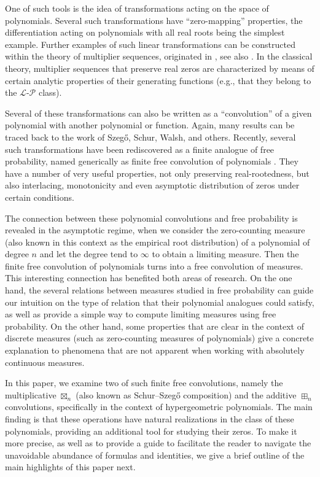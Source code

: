 \documentclass[reqno,11pt]{amsart}
\theoremstyle{remark}
\begin{document}
One of such tools is the idea of transformations acting on the space of polynomials. Several such transformations have ``zero-mapping'' properties,  the differentiation acting on polynomials with all real roots being the simplest example. Further examples of such linear transformations can be constructed within the theory of multiplier sequences, originated in \cite{polya1914uber}, see also \cite{MR1113932,MR0568321,MR1483603,MR3105315,MR3207673,MR2218995}. In the classical theory, multiplier sequences that preserve real zeros are characterized by means of certain analytic properties of their generating functions (e.g., that they belong to the $\mathcal L$-$\mathcal P$ class).  

Several of these transformations can also be written as a ``convolution'' of a given polynomial with another polynomial or function. Again, many results can be traced back to the work of Szeg\H{o}, Schur, Walsh, and others. Recently, several such transformations have been rediscovered as a finite analogue of free probability, named generically as finite free convolution of polynomials \cite{MR4408504}. They have a number of very useful properties, not only preserving real-rootedness, but also interlacing, monotonicity and even asymptotic distribution of zeros under certain conditions.

The connection between these polynomial convolutions and free probability is revealed in the asymptotic regime, when we consider the zero-counting measure (also known in this context as the empirical root distribution) of a polynomial of degree $n$ and let the degree tend to $\infty$ to obtain a limiting measure. Then the finite free convolution of polynomials turns into a free convolution of measures. This interesting connection has benefited both areas of research. On the one hand, the several relations between measures studied in free probability can guide our intuition on the type of relation that their polynomial analogues could satisfy, as well as provide a simple way to compute limiting measures using free probability. On the other hand, some properties that are clear in the context of discrete measures (such as zero-counting measures of polynomials) give a concrete explanation to phenomena that are not apparent when working with absolutely continuous measures.

In this paper, we examine two of such finite free convolutions, namely the multiplicative $\boxtimes_n$ (also known as Schur--Szeg\H{o} composition) and the additive $\boxplus_n$ convolutions, specifically in the context of hypergeometric polynomials. The main finding is that these operations have natural realizations in the class of these polynomials, providing an additional tool for studying their zeros. 
To make it more precise, as well as to provide a guide to facilitate the reader to navigate the unavoidable abundance of formulas and identities, we give a brief outline of the main highlights of this paper next.
\end{document}
